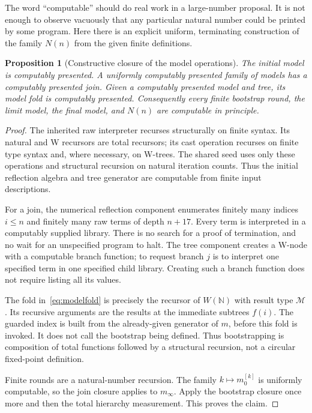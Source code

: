 \documentclass[11pt,letterpaper]{article}
\newtheorem{proposition}[theorem]{Proposition}
\theoremstyle{definition}
\newcommand{\N}{\mathbb N}
\newcommand{\Mod}{\mathcal M}
\begin{document}
The word ``computable'' should do real work in a large-number proposal. It is
not enough to observe vacuously that any particular natural number could be
printed by some program. Here there is an explicit uniform, terminating
construction of the family $N(n)$ from the given finite definitions.

\begin{proposition}[Constructive closure of the model operations]
\label{prop:total}
The initial model is computably presented. A uniformly computably presented
family of models has a computably presented join. Given a computably presented
model and tree, its model fold is computably presented. Consequently every
finite bootstrap round, the limit model, the final model, and $N(n)$ are
computable in principle.
\end{proposition}
\begin{proof}
The inherited raw interpreter recurses structurally on finite syntax. Its
natural and W recursors are total recursors; its cast operation recurses on
finite type syntax and, where necessary, on W-trees. The shared seed uses
only these operations and structural recursion on natural iteration counts.
Thus the initial reflection algebra and tree generator are computable from
finite input descriptions.

For a join, the numerical reflection component enumerates finitely many
indices $i\le n$ and finitely many raw terms of depth $n+17$. Every term is
interpreted in a computably supplied library. There is no search for a proof
of termination, and no wait for an unspecified program to halt. The tree
component creates a W-node with a computable branch function; to request
branch $j$ is to interpret one specified term in one specified child library.
Creating such a branch function does not require listing all its values.

The fold in~\eqref{eq:modelfold} is precisely the recursor of $W(\N)$ with
result type $\Mod$. Its recursive arguments are the results at the immediate
subtrees $f(i)$. The guarded index is built from the already-given generator
of $m$, before this fold is invoked. It does not call the bootstrap being
defined. Thus bootstrapping is composition of total functions followed by a
structural recursion, not a circular fixed-point definition.

Finite rounds are a natural-number recursion. The family
$k\mapsto m_0^{[k]}$ is uniformly computable, so the join closure applies to
$m_\infty$. Apply the bootstrap closure once more and then the total hierarchy
measurement. This proves the claim.
\end{proof}
\end{document}
